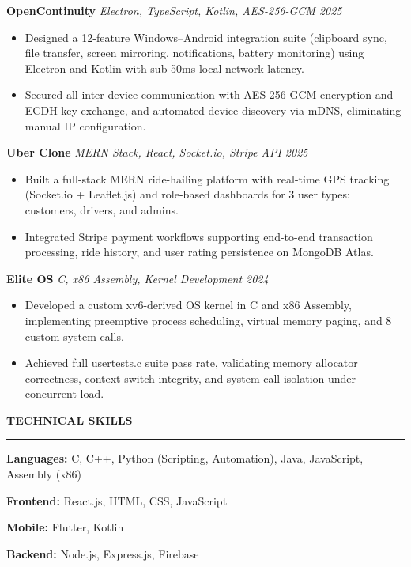 \documentclass[11pt]{article}
\newcommand{\sectionhead}[1]{{\color{darkblue}\fontsize{12pt}{12pt}\selectfont\textbf{#1}}\vspace{4pt}\hrule\vspace{6pt}}
\newcommand{\subsectionhead}[2]{{\textbf{#1}} \hfill {\textit{#2}}\vspace{2pt}}
\begin{document}
\subsectionhead{OpenContinuity}{Electron, TypeScript, Kotlin, AES-256-GCM \hfill 2025}
\begin{itemize}
    \item Designed a 12-feature Windows–Android integration suite (clipboard sync, file transfer, screen mirroring, notifications, battery monitoring) using Electron and Kotlin with sub-50ms local network latency.
    \item Secured all inter-device communication with AES-256-GCM encryption and ECDH key exchange, and automated device discovery via mDNS, eliminating manual IP configuration.
\end{itemize}

\subsectionhead{Uber Clone}{MERN Stack, React, Socket.io, Stripe API \hfill 2025}
\begin{itemize}
    \item Built a full-stack MERN ride-hailing platform with real-time GPS tracking (Socket.io + Leaflet.js) and role-based dashboards for 3 user types: customers, drivers, and admins.
    \item Integrated Stripe payment workflows supporting end-to-end transaction processing, ride history, and user rating persistence on MongoDB Atlas.
\end{itemize}

\subsectionhead{Elite OS}{C, x86 Assembly, Kernel Development \hfill 2024}
\begin{itemize}
    \item Developed a custom xv6-derived OS kernel in C and x86 Assembly, implementing preemptive process scheduling, virtual memory paging, and 8 custom system calls.
    \item Achieved full usertests.c suite pass rate, validating memory allocator correctness, context-switch integrity, and system call isolation under concurrent load.
\end{itemize}

\vspace{6pt}

\sectionhead{TECHNICAL SKILLS}

\textbf{Languages:} C, C++, Python (Scripting, Automation), Java, JavaScript, Assembly (x86)

\textbf{Frontend:} React.js, HTML, CSS, JavaScript

\textbf{Mobile:} Flutter, Kotlin

\textbf{Backend:} Node.js, Express.js, Firebase
\end{document}
